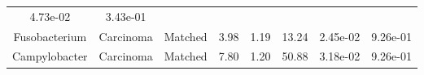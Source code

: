 \documentclass[12pt,]{article}
\begin{document}
\begin{longtable}[]{@{}cccccccc@{}}
\begin{minipage}[t]{0.06\columnwidth}
4.73e-02\strut
\end{minipage} & \begin{minipage}[t]{0.06\columnwidth}\centering\strut
3.43e-01\strut
\end{minipage}\tabularnewline
\begin{minipage}[t]{0.19\columnwidth}\centering\strut
Fusobacterium\strut
\end{minipage} & \begin{minipage}[t]{0.07\columnwidth}\centering\strut
Carcinoma\strut
\end{minipage} & \begin{minipage}[t]{0.09\columnwidth}\centering\strut
Matched\strut
\end{minipage} & \begin{minipage}[t]{0.03\columnwidth}\centering\strut
3.98\strut
\end{minipage} & \begin{minipage}[t]{0.14\columnwidth}\centering\strut
1.19\strut
\end{minipage} & \begin{minipage}[t]{0.14\columnwidth}\centering\strut
13.24\strut
\end{minipage} & \begin{minipage}[t]{0.06\columnwidth}\centering\strut
2.45e-02\strut
\end{minipage} & \begin{minipage}[t]{0.06\columnwidth}\centering\strut
9.26e-01\strut
\end{minipage}\tabularnewline
\begin{minipage}[t]{0.19\columnwidth}\centering\strut
Campylobacter\strut
\end{minipage} & \begin{minipage}[t]{0.07\columnwidth}\centering\strut
Carcinoma\strut
\end{minipage} & \begin{minipage}[t]{0.09\columnwidth}\centering\strut
Matched\strut
\end{minipage} & \begin{minipage}[t]{0.03\columnwidth}\centering\strut
7.80\strut
\end{minipage} & \begin{minipage}[t]{0.14\columnwidth}\centering\strut
1.20\strut
\end{minipage} & \begin{minipage}[t]{0.14\columnwidth}\centering\strut
50.88\strut
\end{minipage} & \begin{minipage}[t]{0.06\columnwidth}\centering\strut
3.18e-02\strut
\end{minipage} & \begin{minipage}[t]{0.06\columnwidth}\centering\strut
9.26e-01\strut
\end{minipage}\tabularnewline
\bottomrule
\end{longtable}
\end{document}
